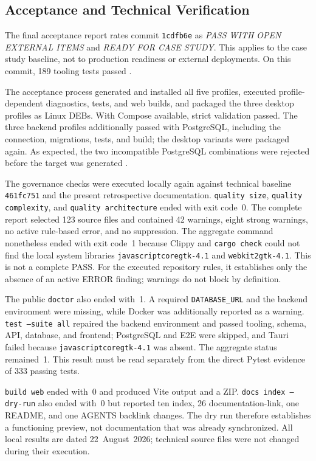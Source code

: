 \subsection{Acceptance and Technical Verification}
\label{subsec:abnahme-technische-verifikation}

The final acceptance report rates commit \texttt{1cdfb6e} as \emph{PASS
WITH OPEN EXTERNAL ITEMS} and \emph{READY FOR CASE STUDY}. This applies to the
case study baseline, not to production readiness or external deployments. On
this commit, 189 tooling tests passed
\parencite{kleiveist2026acceptance}.

The acceptance process generated and installed all five profiles, executed
profile-dependent diagnostics, tests, and web builds, and packaged the three
desktop profiles as Linux DEBs. With Compose available, strict validation
passed. The three backend profiles additionally passed with PostgreSQL,
including the connection, migrations, tests, and build; the desktop variants
were packaged again. As expected, the two incompatible PostgreSQL combinations
were rejected before the target was generated
\parencite{kleiveist2026acceptance}.

The governance checks were executed locally again against technical baseline
\texttt{461fc751} and the present retrospective documentation.
\texttt{quality size}, \texttt{quality complexity}, and
\texttt{quality architecture} ended with exit code~0. The complete report
selected 123 source files and contained 42 warnings, eight strong warnings, no
active rule-based error, and no suppression. The aggregate command nonetheless
ended with exit code~1 because Clippy and \texttt{cargo check} could not find
the local system libraries \texttt{javascriptcoregtk-4.1} and
\texttt{webkit2gtk-4.1}. This is not a complete PASS. For the executed
repository rules, it establishes only the absence of an active ERROR finding;
warnings do not block by definition.

The public \texttt{doctor} also ended with~1. A required
\texttt{DATABASE\_URL} and the backend environment were missing, while Docker
was additionally reported as a warning. \texttt{test --suite all} repaired the
backend environment and passed tooling, schema, API, database, and frontend;
PostgreSQL and E2E were skipped, and Tauri failed because
\texttt{javascriptcoregtk-4.1} was absent. The aggregate status remained~1.
This result must be read separately from the direct Pytest evidence of 333
passing tests.

\texttt{build web} ended with~0 and produced Vite output and a ZIP.
\texttt{docs index --dry-run} also ended with~0 but reported ten index, 26
documentation-link, one README, and one AGENTS backlink changes. The dry run
therefore establishes a functioning preview, not documentation that was
already synchronized. All local results are dated 22~August~2026; technical
source files were not changed during their execution.


